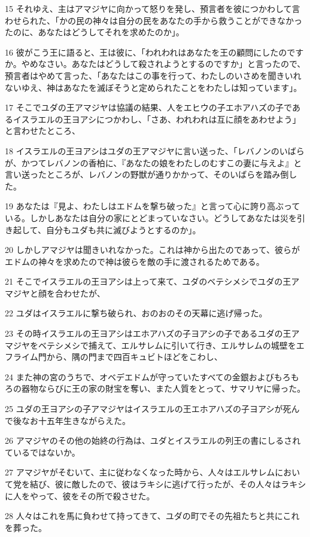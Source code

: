 \par 15 それゆえ、主はアマジヤに向かって怒りを発し、預言者を彼につかわして言わせられた、「かの民の神々は自分の民をあなたの手から救うことができなかったのに、あなたはどうしてそれを求めたのか」。
\par 16 彼がこう王に語ると、王は彼に、「われわれはあなたを王の顧問にしたのですか。やめなさい。あなたはどうして殺されようとするのですか」と言ったので、預言者はやめて言った、「あなたはこの事を行って、わたしのいさめを聞きいれないゆえ、神はあなたを滅ぼそうと定められたことをわたしは知っています」。
\par 17 そこでユダの王アマジヤは協議の結果、人をエヒウの子エホアハズの子であるイスラエルの王ヨアシにつかわし、「さあ、われわれは互に顔をあわせよう」と言わせたところ、
\par 18 イスラエルの王ヨアシはユダの王アマジヤに言い送った、「レバノンのいばらが、かつてレバノンの香柏に、『あなたの娘をわたしのむすこの妻に与えよ』と言い送ったところが、レバノンの野獣が通りかかって、そのいばらを踏み倒した。
\par 19 あなたは『見よ、わたしはエドムを撃ち破った』と言って心に誇り高ぶっている。しかしあなたは自分の家にとどまっていなさい。どうしてあなたは災を引き起して、自分もユダも共に滅びようとするのか」。
\par 20 しかしアマジヤは聞きいれなかった。これは神から出たのであって、彼らがエドムの神々を求めたので神は彼らを敵の手に渡されるためである。
\par 21 そこでイスラエルの王ヨアシは上って来て、ユダのベテシメシでユダの王アマジヤと顔を合わせたが、
\par 22 ユダはイスラエルに撃ち破られ、おのおのその天幕に逃げ帰った。
\par 23 その時イスラエルの王ヨアシはエホアハズの子ヨアシの子であるユダの王アマジヤをベテシメシで捕えて、エルサレムに引いて行き、エルサレムの城壁をエフライム門から、隅の門まで四百キュビトほどをこわし、
\par 24 また神の宮のうちで、オベデエドムが守っていたすべての金銀およびもろもろの器物ならびに王の家の財宝を奪い、また人質をとって、サマリヤに帰った。
\par 25 ユダの王ヨアシの子アマジヤはイスラエルの王エホアハズの子ヨアシが死んで後なお十五年生きながらえた。
\par 26 アマジヤのその他の始終の行為は、ユダとイスラエルの列王の書にしるされているではないか。
\par 27 アマジヤがそむいて、主に従わなくなった時から、人々はエルサレムにおいて党を結び、彼に敵したので、彼はラキシに逃げて行ったが、その人々はラキシに人をやって、彼をその所で殺させた。
\par 28 人々はこれを馬に負わせて持ってきて、ユダの町でその先祖たちと共にこれを葬った。

